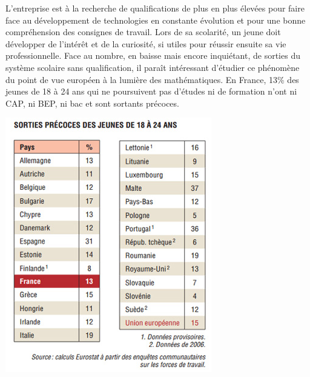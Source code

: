 
\begin{minipage}[top]{10cm}
L'entreprise est à la recherche de qualifications de plus en plus élevées pour faire face au développement de technologies en constante évolution et pour une bonne compréhension des consignes de travail. Lors de sa scolarité, un jeune doit développer de l'intérêt et de la curiosité, si utiles pour réussir ensuite sa vie professionnelle. Face au nombre, en baisse mais encore inquiétant, de sorties du système scolaire sans qualification, il paraît intéressant d'étudier ce phénomène du point de vue européen à la lumière des mathématiques. En France, 13\% des jeunes de 18 à 24 ans qui ne poursuivent pas d'études ni de formation n'ont ni CAP, ni BEP, ni bac et sont sortants précoces.
\end{minipage}
\begin{minipage}{6cm}
\includegraphics[scale=0.5]{stat12.jpg} 
\end{minipage}


